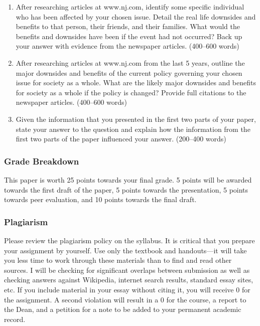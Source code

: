 \documentclass[]{article}
\begin{document}
\begin{enumerate}
\def\labelenumi{\arabic{enumi}.}
\item
  After researching articles at www.nj.com, identify some specific
  individual who has been affected by your chosen issue. Detail the real
  life downsides and benefits to that person, their friends, and their
  families. What would the benefits and downsides have been if the event
  had not occurred? Back up your answer with evidence from the newspaper
  articles. (400--600 words)
\item
  After researching articles at www.nj.com from the last 5 years,
  outline the major downsides and benefits of the current policy
  governing your chosen issue for society as a whole. What are the
  likely major downsides and benefits for society as a whole if the
  policy is changed? Provide full citations to the newspaper articles.
  (400--600 words)
\item
  Given the information that you presented in the first two parts of
  your paper, state your answer to the question and explain how the
  information from the first two parts of the paper influenced your
  answer. (200--400 words)
\end{enumerate}

\subsubsection{Grade Breakdown}\label{grade-breakdown}

This paper is worth 25 points towards your final grade. 5 points will be
awarded towards the first draft of the paper, 5 points towards the
presentation, 5 points towards peer evaluation, and 10 points towards
the final draft.

\subsubsection{Plagiarism}\label{plagiarism}

Please review the plagiarism policy on the syllabus. It is critical that
you prepare your assignment by yourself. Use only the textbook and
handouts---it will take you less time to work through these materials
than to find and read other sources. I will be checking for significant
overlaps between submission as well as checking answers against
Wikipedia, internet search results, standard essay sites, etc. If you
include material in your essay without citing it, you will receive 0 for
the assignment. A second violation will result in a 0 for the course, a
report to the Dean, and a petition for a note to be added to your
permanent academic record.
\end{document}
